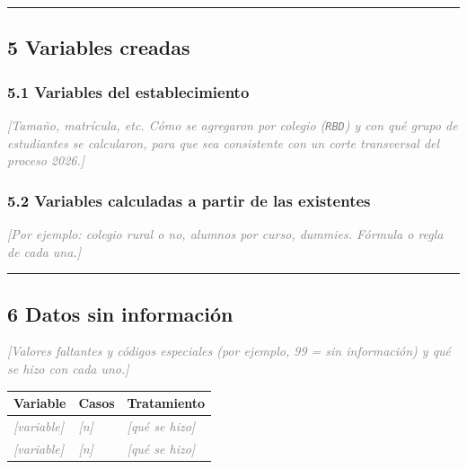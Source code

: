 \documentclass[11pt,letterpaper]{article}
\newcommand{\completar}[1]{\textcolor{gray}{\textit{[#1]}}}
\begin{document}
\medskip\hrule\medskip

\subsection*{5 \; Variables creadas}

\subsubsection*{5.1 \; Variables del establecimiento}

\completar{Tamaño, matrícula, etc. Cómo se agregaron por colegio
(\texttt{RBD}) y con qué grupo de estudiantes se calcularon, para que sea
consistente con un corte transversal del proceso 2026.}

\subsubsection*{5.2 \; Variables calculadas a partir de las existentes}

\completar{Por ejemplo: colegio rural o no, alumnos por curso, dummies.
Fórmula o regla de cada una.}

\medskip\hrule\medskip

\subsection*{6 \; Datos sin información}

\completar{Valores faltantes y códigos especiales (por ejemplo, 99 =
sin información) y qué se hizo con cada uno.}

\begin{center}
\begin{tabular}{>{\raggedright\arraybackslash}p{3.8cm}
                >{\raggedleft\arraybackslash}p{2.4cm}
                >{\raggedright\arraybackslash}p{6.4cm}}
\toprule
\textbf{Variable} & \textbf{Casos} & \textbf{Tratamiento} \\
\midrule
\completar{variable} & \completar{n} & \completar{qué se hizo} \\
\completar{variable} & \completar{n} & \completar{qué se hizo} \\
\bottomrule
\end{tabular}
\end{center}
\end{document}
